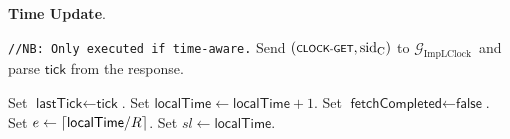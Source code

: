\textbf{Time Update}.\label{apndx:update-time-protocol}
\begin{protocol}
    \caption{$\textsf{UpdateTime}(P, R)$}
    \begin{algorithmic}[1]
        \noindent
        \lstinline|//NB: Only executed if time-aware.|
        \State Send $(\textsf{\scriptsize{CLOCK-GET}}, \text{sid}_\text{C})$ to $\mathcal{G}_{\text{ImpLClock}}$\
        and parse $\textsf{tick}$ from the response.

            \State Set $\textsf{lastTick} \leftarrow \textsf{tick}$.
            \State Set $\textsf{localTime} \leftarrow \textsf{localTime} + 1$.
            \State Set $\textsf{fetchCompleted} \leftarrow \textsf{false}$.
        \EndIf
        \State Set $e \leftarrow \lceil \textsf{localTime}/\\R \rceil$.
        \State Set $sl \leftarrow \textsf{localTime}$.
    \end{algorithmic}\label{alg:update-time-protocol}
\end{protocol}

